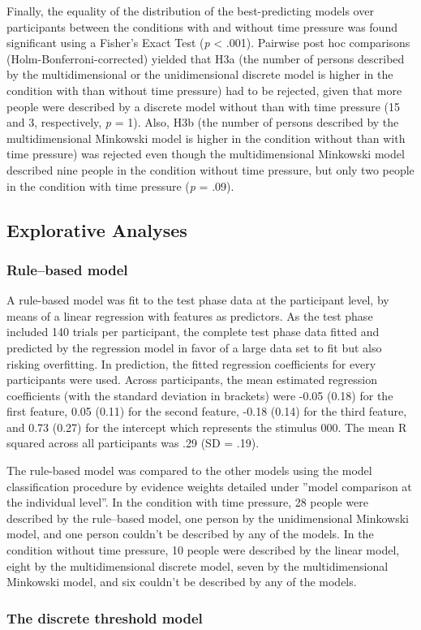 \documentclass[a4paper,man,natbib]{apa6}
\begin{document}
Finally, the equality of the distribution of the best-predicting models over participants between the conditions with and without time pressure was found significant using a Fisher's Exact Test (\textit{p} < .001). Pairwise post hoc comparisons (Holm-Bonferroni-corrected) yielded that H3a (the number of persons described by the multidimensional or the unidimensional discrete model is higher in the condition with than without time pressure) had to be rejected, given that more people were described by a discrete model without than with time pressure (15 and 3, respectively, \textit{p} = 1). Also, H3b (the number of persons described by the multidimensional Minkowski model is higher in the condition without than with time pressure) was rejected even though the multidimensional Minkowski model described nine people in the condition without time pressure, but only two people in the condition with time pressure (\textit{p} = .09).

\subsection{Explorative Analyses}

\subsubsection{Rule--based model}
A rule-based model was fit to the test phase data at the participant level, by means of a linear regression with features as predictors. As the test phase included 140 trials per participant, the complete test phase data fitted and predicted by the regression model in favor of a large data set to fit but also risking overfitting. In prediction, the fitted regression coefficients for every participants were used. Across participants, the mean estimated regression coefficients (with the standard deviation in brackets) were -0.05 (0.18) for the first feature, 0.05 (0.11) for the second feature, -0.18 (0.14) for the third feature, and 0.73 (0.27) for the intercept which represents the stimulus 000. The mean R squared across all participants was .29 (SD = .19).

The rule-based model was compared to the other models using the model classification procedure by evidence weights detailed under ''model comparison at the individual level''. In the condition with time pressure, 28 people were described by the rule--based model, one person by the unidimensional Minkowski model, and one person couldn't be described by any of the models. In the condition without time pressure, 10 people were described by the linear model, eight by the multidimensional discrete model, seven by the multidimensional Minkowski model, and six couldn't be described by any of the models. 

\subsubsection{The discrete threshold model}


\end{document}
